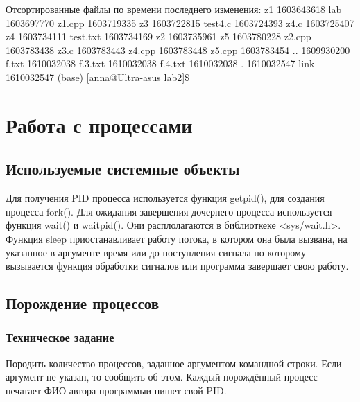 \documentclass[a4paper,12pt]{extarticle}
\begin{document}
Отсортированные файлы по времени последнего изменения:\newline
z1 1603643618\newline
lab 1603697770\newline
z1.cpp 1603719335\newline
z3 1603722815\newline
test4.c 1603724393\newline
z4.c 1603725407\newline
z4 1603734111\newline
test.txt 1603734169\newline
z2 1603735961\newline
z5 1603780228\newline
z2.cpp 1603783438\newline
z3.c 1603783443\newline
z4.cpp 1603783448\newline
z5.cpp 1603783454\newline
.. 1609930200\newline
f.txt 1610032038\newline
f.3.txt 1610032038\newline
f.4.txt 1610032038\newline
. 1610032547\newline
link 1610032547\newline
(base) [anna@Ultra-asus lab2]\$ \newline
\newpage

\section{Работа с процессами}
\subsection{Используемые системные объекты}
Для получения PID процесса используется функция getpid(), для создания процесса fork(). Для ожидания завершения дочернего процесса используется функция wait() и waitpid(). Они расплолагаются в библиоткеке <sys/wait.h>.
Функция sleep приостанавливает работу потока, в котором она была вызвана, на указанное в аргументе время или до поступления сигнала по которому вызывается функция обработки сигналов или программа завершает свою работу.

\subsection{Порождение процессов}
\subsubsection{Техническое задание}
Породить  количество  процессов,  заданное  аргументом  командной строки. Если аргумент не указан, то сообщить об этом. Каждый  порождённый  процесс  печатает ФИО автора  программыи пишет свой PID.
\end{document}
